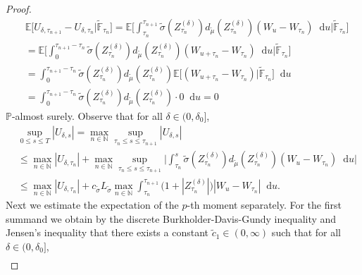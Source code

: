 \documentclass[11pt,a4paper]{article}
\numberwithin{equation}{section}
\theoremstyle{definition}
\newcommand{\E}{{\mathbb{E}}}
\newcommand{\N}{{\mathbb{N}}}
\renewcommand{\P}{{\mathbb{P}}}
\newcommand{\diff}{\mathop{}\!\mathrm{d}}
\begin{document}
\begin{proof}
    \begin{equation}\label{M19}
        \begin{aligned}
        &\E\Big[ U_{\delta,\tau_{n+1}} - U_{\delta,\tau_{n}}  \Big|\widetilde{\mathbb{F}}_{\tau_n} \Big]
        = \E\Big[ \int_{\tau_n}^{\tau_{n+1}} \widetilde\sigma(Z^{(\delta)}_{\tau_n}) d_{\widetilde\mu}(Z^{(\delta)}_{\tau_n}) (W_u-W_{\tau_n}) \diff u \Big|\widetilde{\mathbb{F}}_{\tau_n} \Big] \\
        &= \E\Big[ \int_{0}^{\tau_{n+1}-\tau_n} \widetilde\sigma(Z^{(\delta)}_{\tau_n}) d_{\widetilde\mu}(Z^{(\delta)}_{\tau_n}) (W_{u+\tau_n}-W_{\tau_n}) \diff u \Big|\widetilde{\mathbb{F}}_{\tau_n} \Big] \\
        &= \int_{0}^{\tau_{n+1}-\tau_n} \widetilde\sigma(Z^{(\delta)}_{\tau_n}) d_{\widetilde\mu}(Z^{(\delta)}_{\tau_n})  \E\Big[ (W_{u+\tau_n}-W_{\tau_n})  \Big|\widetilde{\mathbb{F}}_{\tau_n} \Big] \diff u \\
        &= \int_{0}^{\tau_{n+1}-\tau_n} \widetilde\sigma(Z^{(\delta)}_{\tau_n}) d_{\widetilde\mu}(Z^{(\delta)}_{\tau_n})  \cdot 0 \diff u = 0
        \end{aligned}
    \end{equation}
    $\P$-almost surely.
    Observe that for all $\delta\in(0,\delta_0]$,
    \begin{equation}\label{M25}
        \begin{aligned}
        &\sup_{0\leq s\leq T} |U_{\delta,s}| = \max_{n\in\N} \sup_{\tau_n\leq s \leq \tau_{n+1}} |U_{\delta,s}| \\
        &\leq \max_{n\in\N} |U_{\delta,\tau_n}| + \max_{n\in\N} \sup_{\tau_n\leq s \leq \tau_{n+1}} \Big| \int_{\tau_n}^s \widetilde\sigma(Z^{(\delta)}_{\tau_n}) d_{\widetilde\mu}(Z^{(\delta)}_{\tau_n}) (W_u-W_{\tau_n}) \diff u \Big| \\
        &\leq \max_{n\in\N} |U_{\delta,\tau_n}| + c_{\widetilde\sigma} L_{\widetilde\sigma} \max_{n\in\N} \int_{\tau_n}^{\tau_{n+1}} \big( 1 +  |Z^{(\delta)}_{\tau_n}|\big)|W_u-W_{\tau_n}| \diff u.
        \end{aligned}
    \end{equation}
    Next we estimate the expectation of the $p$-th moment separately. For the first summand we obtain by the discrete Burkholder-Davis-Gundy inequality and Jensen's inequality that there exists a constant $\widetilde c_1\in(0,\infty)$ such that for all $\delta\in(0,\delta_0]$,
    \begin{equation}\label{M27}
        \begin{aligned}

\end{aligned}
\end{equation}
\end{proof}
\end{document}
